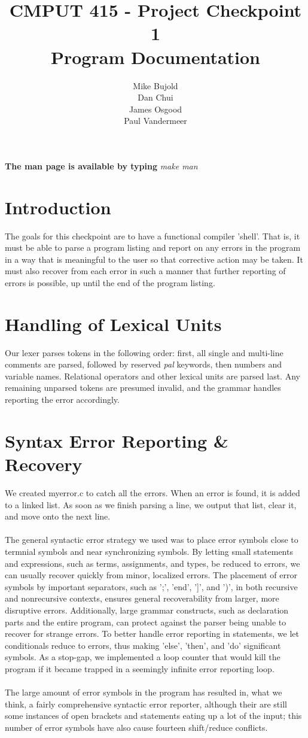 \documentclass{report}
\title{CMPUT 415 - Project Checkpoint 1\\Program Documentation}
\author{Mike Bujold \\
Dan Chui \\ 
James Osgood \\
Paul Vandermeer}
\begin{document}
\maketitle
\textbf{The man page is available by typing} \emph{make man}

\section*{Introduction}
The goals for this checkpoint are to have a functional compiler 'shell'. That is, it must be able to parse a program listing and report on any errors in the program in a way that is meaningful to the user so that corrective action may be taken. It must also recover from each error in such a manner that further reporting of errors is possible, up until the end of the program listing.


\section*{Handling of Lexical Units}
Our lexer parses tokens in the following order: first, all single and multi-line comments are parsed, followed by reserved \emph{pal} keywords, then numbers and variable names. Relational operators and other lexical units are parsed last. Any remaining unparsed tokens are presumed invalid, and the grammar handles reporting the error accordingly.


\section*{Syntax Error Reporting \& Recovery}
We created myerror.c to catch all the errors. When an error is found, it is added to a linked list. As soon as we finish parsing a line, we output that list, clear it, and move onto the next line.
\\
\\
The general syntactic error strategy we used was to place error symbols close to termnial symbols and near synchronizing symbols. 
By letting small statements and expressions, such as terms, assignments, and types, be reduced to errors, we can usually recover quickly from minor, localized errors. 
The placement of error symbols by important separators, such as ';', 'end', ']', and ')', in both recursive and nonrecursive contexts, ensures general recoverability from larger, more disruptive errors.
Additionally, large grammar constructs, such as declaration parts and the entire program, can protect against the parser being unable to recover for strange errors. 
To better handle error reporting in statements, we let conditionals reduce to errors, thus making 'else', 'then', and 'do' significant symbols. As a stop-gap, we implemented a loop counter that would kill the program if it became trapped in a seemingly infinite error reporting loop.
\\
\\
The large amount of error symbols in the program has resulted in, what we think, a fairly comprehensive syntactic error reporter, although their are still some instances of open brackets and statements eating up a lot of the input; this number of error symbols have also cause fourteen shift/reduce conflicts.
\end{document}
